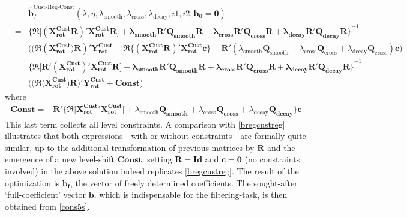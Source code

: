 \documentclass[11pt]{article}
\begin{document}
\begin{eqnarray}\label{bregcustregconst}
&&\mathbf{\hat{b}}^{\textrm{Cust-Reg-Const}}_f(\lambda,\eta,\lambda_{\textrm{smooth}},\lambda_{\textrm{cross}},\lambda_{\textrm{decay}},i1,i2,\mathbf{b_0=0})\nonumber\\
&=&\mathbf{\Big\{\Re\Big[(X_{\textrm{rot}}^{\textrm{Cust} }R)' X_{\textrm{rot}}^{\textrm{Cust}}R\Big]+
\lambda_{\textrm{smooth}}\mathbf{R'Q_{smooth}}R+\lambda_{\textrm{cross}}\mathbf{R'Q_{cross}R}+\lambda_{\textrm{decay}}\mathbf{R'Q_{decay}R}
\Big\}}^{-1}\nonumber\\
&&\Big((\Re(\mathbf{X_{\textrm{rot}}^{\textrm{Cust}})R})'
\mathbf{Y_{\textrm{rot}}^{\textrm{Cust}}}-\Re\bigg\{(\mathbf{X_{\textrm{rot}}^{\textrm{Cust}}R})'\mathbf{X_{\textrm{rot}}^{\textrm{Cust}}c}\bigg\}-
\mathbf{R}'(\lambda_{\textrm{smooth}}\mathbf{Q}_{\textrm{smooth}}+\lambda_{\textrm{cross}}\mathbf{Q}_{\textrm{cross}}+
\lambda_{\textrm{decay}}\mathbf{Q}_{\textrm{cross}})\mathbf{c}\Big)\nonumber\\
&=&\mathbf{\Big\{\Re\Big[R'(X_{\textrm{rot}}^{\textrm{Cust} })' X_{\textrm{rot}}^{\textrm{Cust}}R\Big]+
\lambda_{\textrm{smooth}}\mathbf{R'Q_{smooth}}R+\lambda_{\textrm{cross}}\mathbf{R'Q_{cross}R}+\lambda_{\textrm{decay}}\mathbf{R'Q_{decay}R}
\Big\}}^{-1}\nonumber\\
&&\Big((\Re(\mathbf{X_{\textrm{rot}}^{\textrm{Cust}})R)}'
\mathbf{Y_{\textrm{rot}}^{\textrm{Cust}}}+\mathbf{Const}\Big)
\end{eqnarray}
where 
\begin{eqnarray*}
\mathbf{Const}=-\mathbf{R}'\Big\{\Re\Big[\mathbf{X_{\textrm{rot}}^{\textrm{Cust}}}'\mathbf{X_{\textrm{rot}}^{\textrm{Cust}}}\Big]+
\lambda_{\textrm{smooth}}\mathbf{Q_{\textrm{smooth}}}+\lambda_{\textrm{cross}}\mathbf{Q_{\textrm{cross}}}+
\lambda_{\textrm{decay}}\mathbf{Q_{\textrm{decay}}}\Big\}\mathbf{c}
\end{eqnarray*}
This last term collects all level constraints. A comparison with \ref{bregcustreg} illustrates that both expressions - with or without constraints - are formally quite similar, up to the additional transformation of previous matrices by $\mathbf{R}$ and the emergence of a new level-shift $\mathbf{Const}$: setting $\mathbf{R=Id}$ and $\mathbf{c=0}$ (no constraints involved) in the above solution indeed replicates  \ref{bregcustreg}. The result of the optimization is $\mathbf{b_f}$, the vector of freely determined coefficients. 
The sought-after `full-coefficient' vector $\mathbf{b}$, which is indispensable for the filtering-task, is then obtained from \ref{cons5s}.\\
\end{document}
